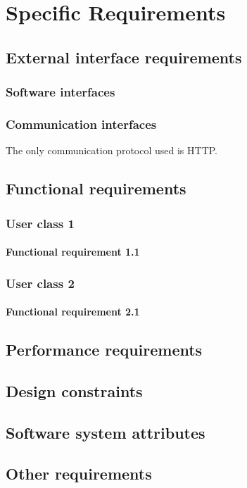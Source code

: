 \chapter{Specific Requirements}

\section{External interface requirements}

\subsection{Software interfaces}
\subsection{Communication interfaces}
The only communication protocol used is HTTP.

\section{Functional requirements}
\subsection{User class 1}
\subsubsection{Functional requirement 1.1}
\subsection{User class 2}
\subsubsection{Functional requirement 2.1}

\section{Performance requirements}
\section{Design constraints}
\section{Software system attributes}
\section{Other requirements}